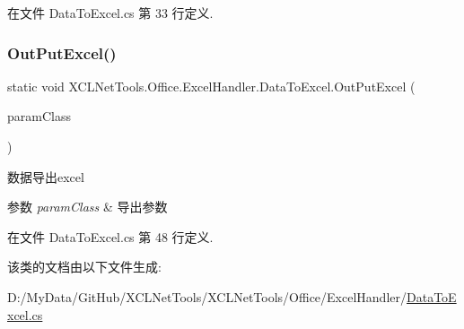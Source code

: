 在文件 Data\+To\+Excel.\+cs 第 33 行定义.

\mbox{\label{class_x_c_l_net_tools_1_1_office_1_1_excel_handler_1_1_data_to_excel_a3759ee10656502d21192b36d2e29a9b3}} 
\subsubsection{\texorpdfstring{Out\+Put\+Excel()}{OutPutExcel()}\hspace{0.1cm}{\footnotesize\ttfamily [2/2]}}
{\footnotesize\ttfamily static void X\+C\+L\+Net\+Tools.\+Office.\+Excel\+Handler.\+Data\+To\+Excel.\+Out\+Put\+Excel (\begin{DoxyParamCaption}\item[{\hyperlink{class_x_c_l_net_tools_1_1_entity_1_1_office_1_1_excel_handler_1_1_out_put_param_class}{Out\+Put\+Param\+Class}}]{param\+Class }\end{DoxyParamCaption})\hspace{0.3cm}{\ttfamily [static]}}



数据导出excel 


\begin{DoxyParams}{参数}
{\em param\+Class} & 导出参数\\
\hline
\end{DoxyParams}


在文件 Data\+To\+Excel.\+cs 第 48 行定义.



该类的文档由以下文件生成\+:\begin{DoxyCompactItemize}
\item 
D\+:/\+My\+Data/\+Git\+Hub/\+X\+C\+L\+Net\+Tools/\+X\+C\+L\+Net\+Tools/\+Office/\+Excel\+Handler/\hyperlink{_data_to_excel_8cs}{Data\+To\+Excel.\+cs}\end{DoxyCompactItemize}
